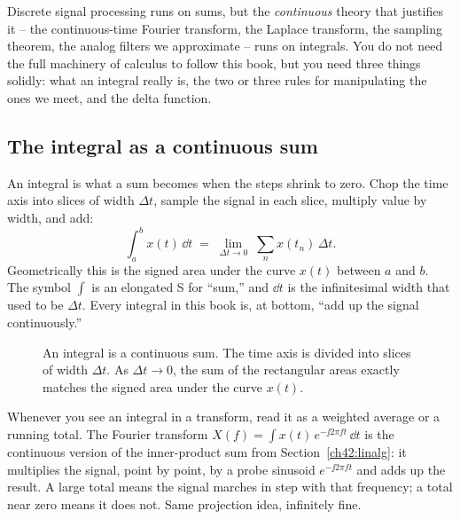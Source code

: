 Discrete signal processing runs on sums, but the \emph{continuous} theory that justifies it --
the continuous-time Fourier transform, the Laplace transform, the sampling theorem, the analog
filters we approximate -- runs on integrals. You do not need the full machinery of calculus to
follow this book, but you need three things solidly: what an integral really is, the two or three
rules for manipulating the ones we meet, and the delta function.

\subsection{The integral as a continuous sum}

An integral is what a sum becomes when the steps shrink to zero. Chop the time axis into slices
of width $\Delta t$, sample the signal in each slice, multiply value by width, and add:
\[
  \int_a^b x(t)\,\dd t \;=\; \lim_{\Delta t\to 0}\;\sum_n x(t_n)\,\Delta t.
\]
Geometrically this is the signed area under the curve $x(t)$ between $a$ and $b$. The symbol
$\int$ is an elongated S for ``sum,'' and $\dd t$ is the infinitesimal width that used to be
$\Delta t$. Every integral in this book is, at bottom, ``add up the signal continuously.''

\begin{figure}[H]
\centering
{}
\caption{An integral is a continuous sum. The time axis is divided into slices of width $\Delta t$. As $\Delta t \to 0$, the sum of the rectangular areas exactly matches the signed area under the curve $x(t)$.}
\label{ch42:fig-integral-area}
\end{figure}


\begin{intuitionbox}
Whenever you see an integral in a transform, read it as a weighted average or a running total.
The Fourier transform $X(f) = \int x(t)\,e^{-\jj 2\pi f t}\,\dd t$ is the continuous version of
the inner-product sum from Section~\ref{ch42:linalg}: it multiplies the signal, point by point,
by a probe sinusoid $e^{-\jj 2\pi f t}$ and adds up the result. A large total means the signal
marches in step with that frequency; a total near zero means it does not. Same projection idea,
infinitely fine.
\end{intuitionbox}

